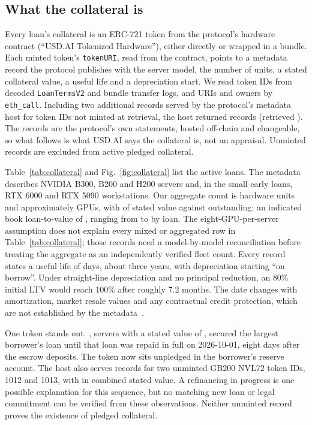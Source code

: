\begin{table}[t]
\caption{USDai minting and redemption by backing asset}
\label{tab:usdai}
\centering
\footnotesize

\end{table}

\subsection{What the collateral is}\label{sec:collateral}
Every loan's collateral is an ERC-721 token from the protocol's hardware contract (``USD.AI Tokenized Hardware''), either directly or wrapped in a bundle. Each minted token's \texttt{tokenURI}, read from the contract, points to a metadata record the protocol publishes with the server model, the number of units, a stated collateral value, a useful life and a depreciation start. We read token IDs from decoded \texttt{LoanTermsV2} and bundle transfer logs, and URIs and owners by \texttt{eth\_call}. Including two additional records served by the protocol's metadata host for token IDs not minted at retrieval, the host returned \CollRecords{} records (retrieved \CollRetrieved{}). The records are the protocol's own statements, hosted off-chain and changeable, so what follows is what USD.AI says the collateral is, not an appraisal. Unminted records are excluded from active pledged collateral.

Table~\ref{tab:collateral} and Fig.~\ref{fig:collateral} list the active loans. The metadata describes NVIDIA B300, B200 and H200 servers and, in the small early loans, RTX 6000 and RTX 5090 workstations. Our aggregate count is \CollUnits{} hardware units and approximately \CollGPUs{} GPUs, with \CollValue{} of stated value against \Outstanding{} outstanding: an indicated book loan-to-value of \BookLTV{}, ranging from \LTVMin{} to \LTVMax{} by loan. The eight-GPU-per-server assumption does not explain every mixed or aggregated row in Table~\ref{tab:collateral}; those records need a model-by-model reconciliation before treating the aggregate as an independently verified fleet count. Every record states a useful life of \UsefulLife{} days, about three years, with depreciation starting ``on borrow''. Under straight-line depreciation and no principal reduction, an 80\% initial LTV would reach 100\% after roughly 7.2 months. The date changes with amortization, market resale values and any contractual credit protection, which are not established by the metadata~\cite{cerron2026gpu}.

One token stands out. \UnpledgedName{}, \UnpledgedUnits{} servers with a stated value of \UnpledgedValue{}, secured the largest borrower's \UnpledgedPrior{} loan until that loan was repaid in full on 2026-10-01, eight days after the \EscrowOpen{} escrow deposits. The token now sits unpledged in the borrower's reserve account. The host also serves records for two unminted GB200 NVL72 token IDs, 1012 and 1013, with \UnmintedValue{} in combined stated value. A refinancing in progress is one possible explanation for this sequence, but no matching new loan or legal commitment can be verified from these observations. Neither unminted record proves the existence of pledged collateral.

